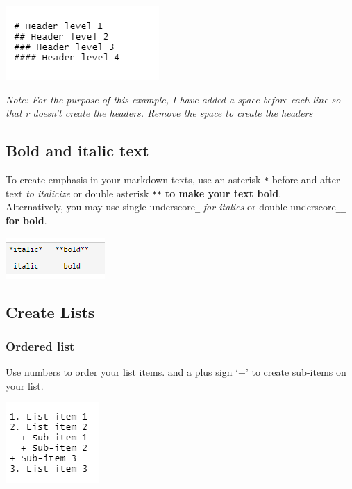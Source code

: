 \documentclass[
]{book}
\let\origfigure\figure
\let\endorigfigure\endfigure
\renewenvironment{figure}[1][2] {
    \expandafter\origfigure\expandafter[H]
} {
    \endorigfigure
}
\begin{document}
\begin{figure}
\centering
\includegraphics{tutorial_screenshots/headers.png}
\caption{headers}
\end{figure}

\emph{Note: For the purpose of this example, I have added a space before each line so that r doesn't create the headers. Remove the space to create the headers}

\hypertarget{bold-and-italic-text}{%
\subsection{Bold and italic text}\label{bold-and-italic-text}}

To create emphasis in your markdown texts, use an asterisk \texttt{*} before and after text \emph{to italicize} or double asterisk \texttt{**} \textbf{to make your text bold}.\\
Alternatively, you may use single underscore\texttt{\_} \emph{for italics} or double underscore\texttt{\_\_} \textbf{for bold}.

\begin{figure}
\centering
\includegraphics{tutorial_screenshots/italics_bold.png}
\caption{text emphasis}
\end{figure}

\hypertarget{create-lists}{%
\subsection{Create Lists}\label{create-lists}}

\hypertarget{ordered-list}{%
\subsubsection{Ordered list}\label{ordered-list}}

Use numbers to order your list items.
and a plus sign `+' to create sub-items on your list.

\begin{figure}
\centering
\includegraphics{tutorial_screenshots/ordered_list.png}
\caption{ordered list}
\end{figure}
\end{document}
